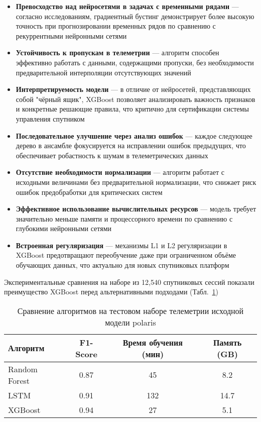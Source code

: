 \begin{itemize}
	\item \textbf{Превосходство над нейросетями в задачах с временными рядами} — согласно исследованиям, градиентный бустинг демонстрирует более высокую точность при прогнозировании временных рядов по сравнению с рекуррентными нейронными сетями
	\item \textbf{Устойчивость к пропускам в телеметрии} — алгоритм способен эффективно работать с данными, содержащими пропуски, без необходимости предварительной интерполяции отсутствующих значений
	\item \textbf{Интерпретируемость модели} — в отличие от нейросетей, представляющих собой "чёрный ящик", XGBoost позволяет анализировать важность признаков и конкретные решающие правила, что критично для сертификации системы управления спутником
	\item \textbf{Последовательное улучшение через анализ ошибок} — каждое следующее дерево в ансамбле фокусируется на исправлении ошибок предыдущих, что обеспечивает робастность к шумам в телеметрических данных
	\item \textbf{Отсутствие необходимости нормализации} — алгоритм работает с исходными величинами без предварительной нормализации, что снижает риск ошибок предобработки для критических систем
	\item \textbf{Эффективное использование вычислительных ресурсов} — модель требует значительно меньше памяти и процессорного времени по сравнению с глубокими нейронными сетями
	\item \textbf{Встроенная регуляризация} — механизмы L1 и L2 регуляризации в XGBoost предотвращают переобучение даже при ограниченном объёме обучающих данных, что актуально для новых спутниковых платформ
\end{itemize}

Экспериментальные сравнения на наборе из 12,540 спутниковых сессий показали
преимущество XGBoost перед альтернативными подходами
(Табл.~\ref{tab:ml_comparison})

\begin{table}[h]
	\centering
	\begin{tabular}{|l|c|c|c|}
		\hline
		\textbf{Алгоритм} & \textbf{F1-Score} & \textbf{Время обучения (мин)} & \textbf{Память (GB)} \\
		\hline
		Random Forest     & 0.87              & 45                            & 8.2                  \\
		LSTM              & 0.91              & 132                           & 14.7                 \\
		XGBoost           & 0.94              & 27                            & 5.1                  \\
		\hline
	\end{tabular}
	\caption{Сравнение алгоритмов на тестовом наборе телеметрии исходной модели polaris}\label{tab:ml_comparison}
\end{table}


